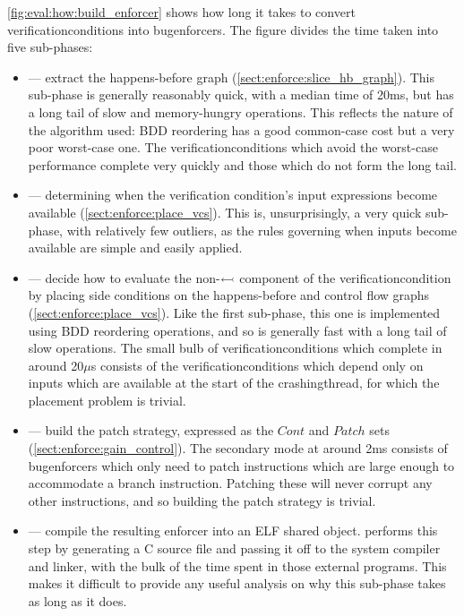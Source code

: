 \noindent
\autoref{fig:eval:how:build_enforcer} shows how long it takes to
convert \glspl{verificationcondition} into \glspl{bugenforcer}.  The
figure divides the time taken into five sub-phases:
\begin{itemize}
\item {} --- extract the happens-before graph
  (\autoref{sect:enforce:slice_hb_graph}).  This sub-phase is generally
  reasonably quick, with a median time of 20ms, but has a long tail of
  slow and memory-hungry operations.  This reflects the nature of the
  algorithm used: BDD reordering has a good common-case cost but a
  very poor worst-case one.  The \glspl{verificationcondition} which
  avoid the worst-case performance complete very quickly and those
  which do not form the long tail.
\item {} --- determining when the verification condition's
  input expressions become available
  (\autoref{sect:enforce:place_vcs}).  This is, unsurprisingly, a very
  quick sub-phase, with relatively few outliers, as the rules governing
  when inputs become available are simple and easily applied.
\item {} --- decide how to evaluate the
  non-$\leftarrowtail$ component of the
  \gls{verificationcondition} by placing \glspl{side condition} on the
  happens-before and control flow graphs
  (\autoref{sect:enforce:place_vcs}).  Like the first sub-phase, this one
  is implemented using BDD reordering operations, and so is generally
  fast with a long tail of slow operations.  The small bulb of
  \glspl{verificationcondition} which complete in around 20$\mu$s
  consists of the \glspl{verificationcondition} which depend only on
  inputs which are available at the start of the \gls{crashingthread},
  for which the placement problem is trivial.
\item {} --- build the patch strategy, expressed as the
  $\mathit{Cont}$ and $\mathit{Patch}$ sets
  (\autoref{sect:enforce:gain_control}).  The secondary mode at around
  2ms consists of \glspl{bugenforcer} which only need to patch
  instructions which are large enough to accommodate a branch
  instruction.  Patching these will never corrupt any other
  instructions, and so building the patch strategy is trivial.
\item {} --- compile the resulting enforcer into an ELF shared
  object.  {\Technique} performs this step by generating a C
  source file and passing it off to the system compiler and linker,
  with the bulk of the time spent in those external programs.  This
  makes it difficult to provide any useful analysis on why this sub-phase
  takes as long as it does.
\end{itemize}
